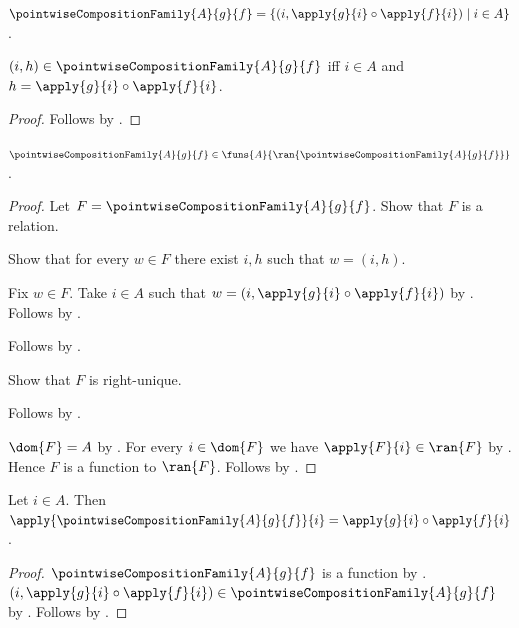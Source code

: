 \begin{definition}\label{pointwise_composition_family}
    $\pointwiseCompositionFamily{A}{g}{f}=
        \{(i,\apply{g}{i}\circ\apply{f}{i})\mid i\in A\}$.
\end{definition}

\begin{proposition}\label{pointwise_composition_family_iff}
    $(i,h)\in\pointwiseCompositionFamily{A}{g}{f}$ iff
        $i\in A$ and $h=\apply{g}{i}\circ\apply{f}{i}$.
\end{proposition}
\begin{proof}
    Follows by
        .
\end{proof}

\begin{proposition}\label{pointwise_composition_family_type}
    $\pointwiseCompositionFamily{A}{g}{f}\in
        \funs{A}{\ran{\pointwiseCompositionFamily{A}{g}{f}}}$.
\end{proposition}
\begin{proof}
    Let $F=\pointwiseCompositionFamily{A}{g}{f}$.
    Show that $F$ is a relation.
    \begin{subproof}
        Show that for every $w\in F$ there exist $i,h$ such that
            $w=(i,h)$.
        \begin{subproof}
            Fix $w\in F$.
            Take $i\in A$ such that
                $w=(i,\apply{g}{i}\circ\apply{f}{i})$ by
                .
            Follows by \auto.
        \end{subproof}
        Follows by .
    \end{subproof}
    Show that $F$ is right-unique.
    \begin{subproof}
        Follows by
            .
    \end{subproof}
    $\dom{F}=A$ by
        .
    For every $i\in\dom{F}$ we have $\apply{F}{i}\in\ran{F}$ by
        .
    Hence $F$ is a function to $\ran{F}$.
    Follows by .
\end{proof}

\begin{proposition}\label{pointwise_composition_family_apply}
    Let $i\in A$.
    Then $\apply{\pointwiseCompositionFamily{A}{g}{f}}{i}
        =\apply{g}{i}\circ\apply{f}{i}$.
\end{proposition}
\begin{proof}
    $\pointwiseCompositionFamily{A}{g}{f}$ is a function by
        .
    $(i,\apply{g}{i}\circ\apply{f}{i})\in
        \pointwiseCompositionFamily{A}{g}{f}$ by
        .
    Follows by .
\end{proof}

